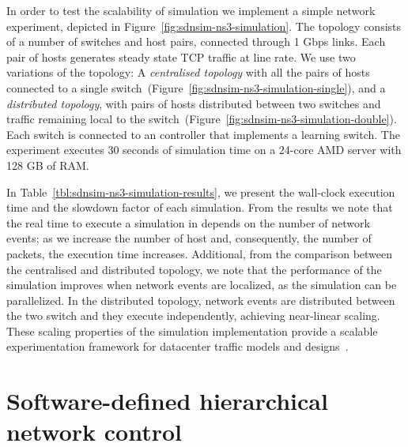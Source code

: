 In order to test the scalability of \sdnsim simulation we implement a
simple network experiment, depicted in Figure~\ref{fig:sdnsim-ns3-simulation}.
The topology consists of a number of switches and host pairs,
connected through 1 Gbps links.  Each pair of hosts generates steady
state TCP traffic at line rate.  We use two variations of the topology: A {\it
  centralised topology} \/with all the pairs of hosts connected to a single
switch~(Figure~\ref{fig:sdnsim-ns3-simulation-single}), and a {\it distributed
  topology}, with pairs of hosts distributed between two switches and traffic
remaining local to the switch~(Figure~\ref{fig:sdnsim-ns3-simulation-double}).
Each switch is connected to an \of controller that implements a learning switch.
The experiment executes 30 seconds of simulation time on a 24-core AMD server
with 128 GB of RAM. 

In Table~\ref{tbl:sdnsim-ns3-simulation-results}, we present the wall-clock
execution time and the slowdown factor of each simulation.  From the results we
note that the real time to execute a simulation in \sdnsim depends on the number
of network events; as we increase the number of host and, consequently, the
number of packets, the execution time increases.  Additional, from the
comparison between the centralised and distributed topology, we note that the
performance of the simulation improves when network events are localized, as the
simulation can be parallelized. In the distributed topology, network events are
distributed between the two switch and they execute independently, achieving
near-linear scaling. These scaling properties of the \sdnsim simulation
implementation provide a scalable experimentation framework for datacenter
traffic models and designs~\cite{Kandula09}. 


\section{Software-defined hierarchical network control} \label{sec:rdsf-eval}

